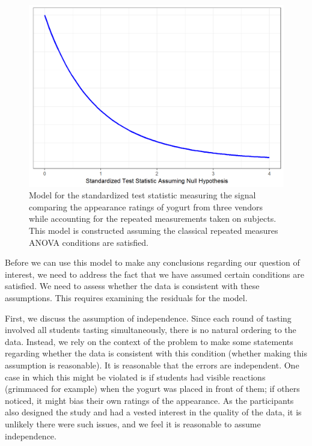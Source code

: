 \documentclass[]{book}
\theoremstyle{plain}
\theoremstyle{mydefn}
\theoremstyle{myexmpl}
\theoremstyle{remark}
\begin{document}
\begin{figure}

{\centering \includegraphics[width=0.8\linewidth]{./Images/blockrecap-classical-null-model-1} 

}

\caption{Model for the standardized test statistic measuring the signal comparing the appearance ratings of yogurt from three vendors while accounting for the repeated measurements taken on subjects.  This model is constructed assuming the classical repeated measures ANOVA conditions are satisfied.}\label{fig:blockrecap-classical-null-model}
\end{figure}

Before we can use this model to make any conclusions regarding our
question of interest, we need to address the fact that we have assumed
certain conditions are satisfied. We need to assess whether the data is
consistent with these assumptions. This requires examining the residuals
for the model.

First, we discuss the assumption of independence. Since each round of
tasting involved all students tasting simultaneously, there is no
natural ordering to the data. Instead, we rely on the context of the
problem to make some statements regarding whether the data is consistent
with this condition (whether making this assumption is reasonable). It
is reasonable that the errors are independent. One case in which this
might be violated is if students had visible reactions (grimmaced for
example) when the yogurt was placed in front of them; if others noticed,
it might bias their own ratings of the appearance. As the participants
also designed the study and had a vested interest in the quality of the
data, it is unlikely there were such issues, and we feel it is
reasonable to assume independence.
\end{document}
